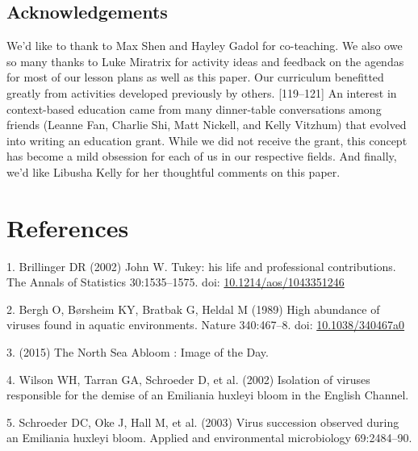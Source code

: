 \documentclass[12pt,twoside]{mitthesis-manusdown}
\begin{document}
\section{Acknowledgements}\label{acknowledgements-2}

We'd like to thank to Max Shen and Hayley Gadol for co-teaching. We also
owe so many thanks to Luke Miratrix for activity ideas and feedback on
the agendas for most of our lesson plans as well as this paper. Our
curriculum benefitted greatly from activities developed previously by
others. {[}119--121{]} An interest in context-based education came from
many dinner-table conversations among friends (Leanne Fan, Charlie Shi,
Matt Nickell, and Kelly Vitzhum) that evolved into writing an education
grant. While we did not receive the grant, this concept has become a
mild obsession for each of us in our respective fields. And finally,
we'd like Libusha Kelly for her thoughtful comments on this paper.

\backmatter

\chapter*{References}\label{references}


\noindent

\setlength{\parindent}{-0.20in} \setlength{\leftskip}{0.20in}
\setlength{\parskip}{8pt} \singlespacing

\hypertarget{refs}{}
\hypertarget{ref-Brillinger2002}{}
1. Brillinger DR (2002) John W. Tukey: his life and professional
contributions. The Annals of Statistics 30:1535--1575. doi:
\href{https://doi.org/10.1214/aos/1043351246}{10.1214/aos/1043351246}

\hypertarget{ref-Bergh1989}{}
2. Bergh O, Børsheim KY, Bratbak G, Heldal M (1989) High abundance of
viruses found in aquatic environments. Nature 340:467--8. doi:
\href{https://doi.org/10.1038/340467a0}{10.1038/340467a0}

\hypertarget{ref-nasa}{}
3. (2015) The North Sea Abloom : Image of the Day.

\hypertarget{ref-Wilson2002}{}
4. Wilson WH, Tarran GA, Schroeder D, et al. (2002) Isolation of viruses
responsible for the demise of an Emiliania huxleyi bloom in the English
Channel.

\hypertarget{ref-Schroeder2003}{}
5. Schroeder DC, Oke J, Hall M, et al. (2003) Virus succession observed
during an Emiliania huxleyi bloom. Applied and environmental
microbiology 69:2484--90.
\end{document}
